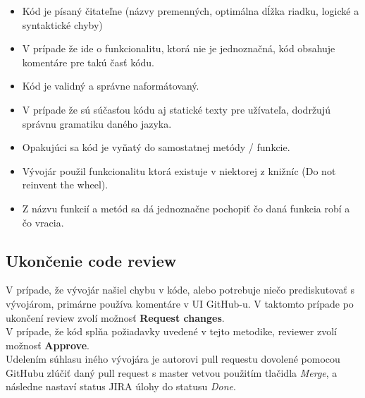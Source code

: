 \documentclass{article}
\begin{document}
    \begin{itemize}
        \item Kód je písaný čitateľne (názvy premenných, optimálna dĺžka riadku, logické a syntaktické chyby)
        \item V prípade že ide o funkcionalitu, ktorá nie je jednoznačná, kód obsahuje komentáre pre takú časť kódu.
        \item Kód je validný a správne naformátovaný.
        \item V prípade že sú súčasťou kódu aj statické texty pre užívateľa, dodržujú správnu gramatiku daného jazyka.
        \item Opakujúci sa kód je vyňatý do samostatnej metódy / funkcie.
        \item Vývojár použil funkcionalitu ktorá existuje v niektorej z knižníc (Do not reinvent the wheel).
        \item Z názvu funkcií a metód sa dá jednoznačne pochopiť čo daná funkcia robí a čo vracia.
    \end{itemize}

    \subsection*{Ukončenie code review}

    \noindent V prípade, že vývojár našiel chybu v kóde, alebo potrebuje niečo prediskutovať s vývojárom, primárne používa komentáre
    v UI GitHub-u. V taktomto prípade po ukončení review zvolí možnosť \textbf{Request changes}. \\

    \noindent V prípade, že kód splňa požiadavky uvedené v tejto metodike, reviewer zvolí možnosť \textbf{Approve}. \\

    \noindent Udelením súhlasu iného vývojára je autorovi pull requestu dovolené pomocou GitHubu zlúčiť daný pull request s master vetvou
    použitím tlačidla \emph{Merge}, a následne nastaví status JIRA úlohy do statusu \emph{Done}.
\end{document}
